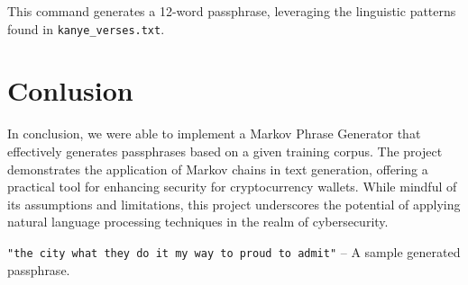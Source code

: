 \documentclass[a4paper,12pt]{article}
\begin{document}
This command generates a 12-word passphrase, leveraging the linguistic patterns found in \texttt{kanye\_verses.txt}.


\section{Conlusion}

In conclusion, we were able to implement a Markov Phrase Generator that effectively generates passphrases based on a given training corpus. The project demonstrates the application of Markov chains in text generation, offering a practical tool for enhancing security for cryptocurrency wallets. While mindful of its assumptions and limitations, this project underscores the potential of applying natural language processing techniques in the realm of cybersecurity.

\texttt{"the city what they do it my way to proud to admit"} -- A sample generated passphrase.
\end{document}
